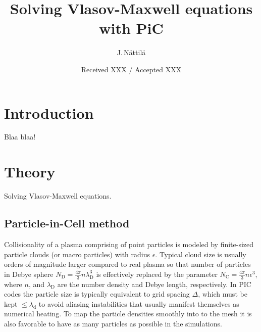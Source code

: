 \documentclass{aa}
\begin{document}
\title{Solving Vlasov-Maxwell equations with PiC}

\author{J.\,N\"attil\"a }


\date{Received XXX / Accepted XXX}




\maketitle

\section{Introduction}\label{sec:intro}
Blaa blaa!

\section{Theory}\label{sect:theory}

Solving Vlasov-Maxwell equations.


\subsection{Particle-in-Cell method}

Collisionality of a plasma comprising of point particles is modeled by finite-sized particle clouds (or macro particles) with radius $\epsilon$.
Typical cloud size is usually orders of magnitude larger compared to real plasma so that number of particles in Debye sphere $N_{\mathrm{D}} = \frac{4 \pi}{3}n\lambda_{\mathrm{D}}^3$ is effectively replaced by the parameter $N_{\mathrm{C}} = \frac{4 \pi}{3}n\epsilon^3$, where $n$, and $\lambda_{\mathrm{D}}$ are the number density and Debye length, respectively.
In PIC codes the particle size is typically equivalent to grid spacing $\Delta$, which must be kept $\le \lambda_{\mathrm{d}}$ to avoid aliasing instabilities that usually manifest themselves as numerical heating.
To map the particle densities smoothly into to the mesh it is also favorable to have as many particles as possible in the simulations.
\end{document}

